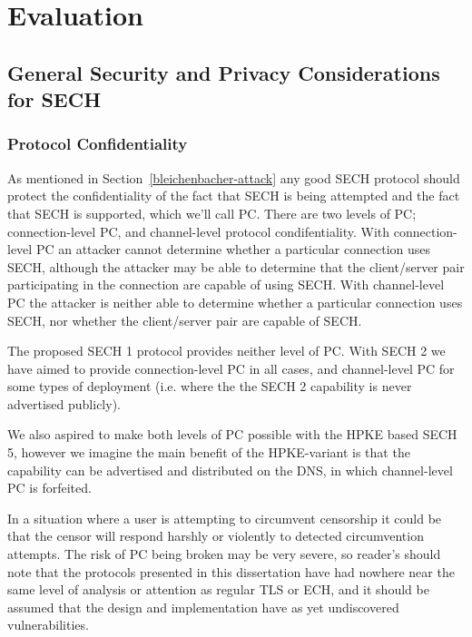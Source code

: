 \chapter{Evaluation}
\label{chap:Evaluation}

\section{General Security and Privacy Considerations for SECH}

\subsection{Protocol Confidentiality}
As mentioned in Section~\ref{bleichenbacher-attack} any good \ac{SECH} protocol should protect the confidentiality of the fact that \ac{SECH} is being attempted and the fact that \ac{SECH} is supported, which we'll call \ac{PC}.
There are two levels of \ac{PC};
connection-level \ac{PC},
and channel-level protocol condifentiality.
With connection-level \ac{PC} an attacker
cannot determine whether a particular connection uses \ac{SECH},
although the attacker may be able to determine that the
client/server pair participating in the connection are
capable of using \ac{SECH}.
With channel-level \ac{PC} the attacker
is neither able to determine whether a particular
connection uses \ac{SECH},
nor whether the client/server pair are capable of \ac{SECH}.

The proposed \ac{SECH} 1 protocol provides neither level of
\ac{PC}. With \ac{SECH} 2 we have aimed
to provide connection-level \ac{PC} in all cases,
and channel-level \ac{PC} for some types of deployment (i.e. where the the \ac{SECH} 2 capability is 
never advertised publicly).

We also aspired to make both levels of \ac{PC} possible
with the \ac{HPKE} based \ac{SECH} 5, however
we imagine the main benefit of the \ac{HPKE}-variant
is that the capability can be advertised and distributed
on the \ac{DNS}, in which channel-level \ac{PC} is forfeited.

In a situation where a user is attempting to circumvent censorship it could be that the censor will respond harshly or violently to detected circumvention attempts.
The risk of \ac{PC} being broken may be
very severe, so reader's should note that the protocols
presented in this dissertation have had nowhere near
the same level of analysis or attention as regular \ac{TLS} or \ac{ECH},
and it should be assumed that the design and implementation
have as yet undiscovered vulnerabilities.

